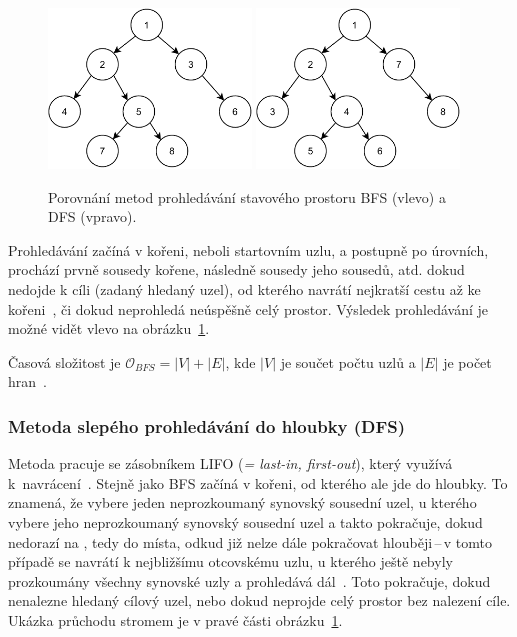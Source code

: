\begin{figure}[H]
    \centering
    \includegraphics[width=0.48\textwidth]{obrazky-figures/ch2/BFS.pdf}\hspace{0.25cm}
    \includegraphics[width=0.48\textwidth]{obrazky-figures/ch2/DFS.pdf}
    \caption{Porovnání metod prohledávání stavového prostoru BFS (vlevo) a DFS (vpravo).}
    \label{fig:BFS_DFS}
\end{figure}

Prohledávání začíná v kořeni, neboli startovním uzlu, a postupně po úrovních, prochází prvně sousedy kořene, následně sousedy jeho sousedů, atd. dokud nedojde k cíli (zadaný hledaný uzel), od kterého navrátí nejkratší cestu až ke kořeni~\cite{Introduction_to_Algorithms}, či dokud neprohledá neúspěšně celý prostor. Výsledek prohledávání je možné vidět vlevo na obrázku~\ref{fig:BFS_DFS}.

Časová složitost je \(\mathcal{O}_{BFS} = |V| + |E|\), kde \(|V|\) je součet počtu uzlů a \(|E|\) je počet hran~\cite{CS225BFSDFS}.

\subsubsection*{\textbullet Metoda slepého prohledávání do hloubky (DFS)}
Metoda pracuje se zásobníkem LIFO (\textit{= last-in, first-out}), který využívá k~navrácení~\cite{poole2023artificial}. Stejně jako BFS začíná v kořeni, od kterého ale jde do hloubky. To znamená, že vybere jeden neprozkoumaný synovský sousední uzel, u kterého vybere jeho neprozkoumaný synovský sousední uzel a takto pokračuje, dokud nedorazí na , tedy do místa, odkud již nelze dále pokračovat hlouběji\,--\,v tomto případě se navrátí k nejbližšímu otcovskému uzlu, u kterého ještě nebyly prozkoumány všechny synovské uzly a prohledává dál~\cite{Introduction_to_Algorithms}. Toto pokračuje, dokud nenalezne hledaný cílový uzel, nebo dokud neprojde celý prostor bez nalezení cíle. Ukázka průchodu stromem je v pravé části obrázku~\ref{fig:BFS_DFS}.

